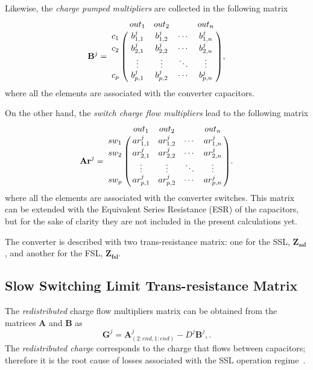 Likewise, the \emph{charge pumped multipliers} are collected in the following matrix
\begin{equation}
 \mathbf{B}^j =
   \bordermatrix { ~ & out_1 & out_2 & ~ & out_n \cr
     c_1  & b_{1,1}^j  & b_{1,2}^j & \cdots & b_{1,n}^j \cr
     c_2  & b_{2,1}^j  & b_{2,2}^j & \cdots & b_{2,n}^j \cr
      ~   & \vdots     & \vdots & \ddots & \vdots \cr
     c_p  & b_{p,1}^j  & b_{p,2}^j & \cdots & b_{p,n}^j \cr}
     \label{eq:A_matrix},
\end{equation}
where all the elements are associated with the converter capacitors.

On the other hand, the \emph{switch charge flow multipliers} lead to the following matrix
\begin{equation}
 \mathbf{Ar}^j =
   \bordermatrix { ~ & out_1 & out_2 & ~ & out_n \cr
     sw_1  & ar_{1,1}^j  & ar_{1,2}^j & \cdots & ar_{1,n}^j \cr
     sw_2  & ar_{2,1}^j  & ar_{2,2}^j & \cdots & ar_{2,n}^j \cr
      ~    & \vdots     & \vdots & \ddots & \vdots \cr
     sw_p  & ar_{p,1}^j  & ar_{p,2}^j & \cdots & ar_{p,n}^j \cr}.
 \label{eq:A_matrix}
\end{equation}
where all the elements are associated with the converter switches. This matrix can be extended with the Equivalent Series Resistance (ESR) of the capacitors, but for the sake of clarity they are not included in the present calculations yet.

 The converter is described with two trans-resistance matrix: one for the SSL, $\mathbf{Z_{ssl}}$, and another for the FSL, $\mathbf{Z_{fsl}}$.

\subsection{Slow Switching Limit Trans-resistance Matrix}

The \emph{redistributed} charge flow multipliers matrix can be obtained from the
matrices $\mathbf{A}$ and $\mathbf{B}$  as
\begin{equation}
 \mathbf{G}^j = \mathbf{A}_{(2:end,1:end)}^j - D^j \mathbf{B}^j,
 \label{eq:R_matrix}.
\end{equation}
The \emph{redistributed charge} corresponds to the charge that flows between capacitors; therefore it is the root cause of
losses associated with the SSL operation regime~\cite{Seeman:EECS-2009-78}.

